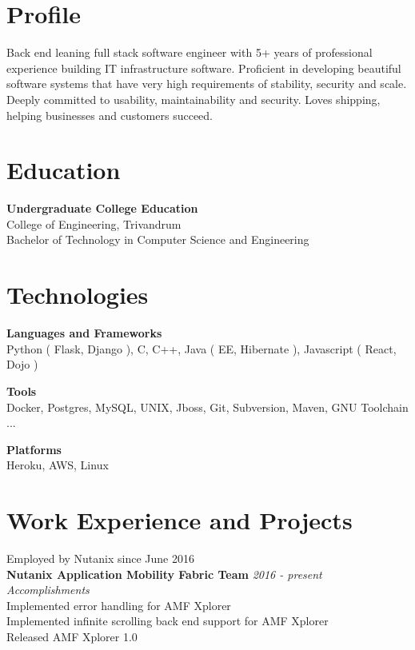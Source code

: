 \documentclass[line,margin]{res}
\begin{document}


\address{joji\_antony@gmx.com}
\address{+91 96323 41954}

\begin{resume}

\section{Profile}
Back end leaning full stack software engineer with 5+ years of professional experience building IT infrastructure software. Proficient in developing beautiful software systems that have very high requirements of stability, security and scale. Deeply committed to usability, maintainability and security. Loves shipping, helping businesses and customers succeed.

\section{Education}
{\bf Undergraduate College Education}\\
College of Engineering, Trivandrum\\
Bachelor of Technology in Computer Science and Engineering\\

\section{Technologies}

{\bf Languages and Frameworks}\\
Python ( Flask, Django ), C, C++, Java ( EE, Hibernate ), Javascript ( React, Dojo )

{\bf Tools}\\
Docker, Postgres, MySQL, UNIX, Jboss, Git, Subversion, Maven, GNU Toolchain ...

{\bf Platforms}\\
Heroku, AWS, Linux

\section{Work Experience and Projects}

Employed by Nutanix since June 2016\\

{\bf Nutanix Application Mobility Fabric Team} \hfill {\it{2016 - present}}\\

{\it{Accomplishments}}\\
Implemented error handling for AMF Xplorer\\
Implemented infinite scrolling back end support for AMF Xplorer\\
Released AMF Xplorer 1.0\\


\end{resume}
\end{document}
